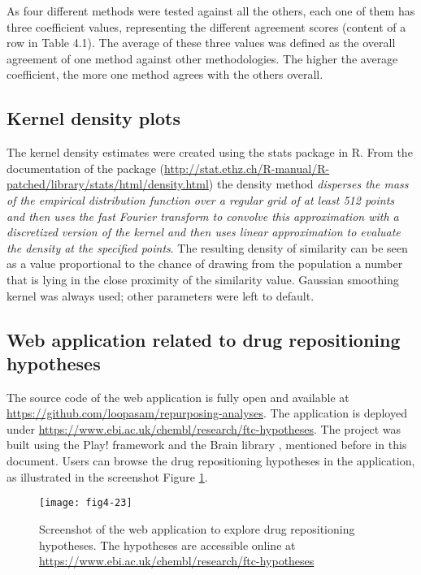 As four different methods were tested against all the others, each one of them has three coefficient values, representing the different agreement scores (content of a row in Table 4.1). The average of these three values was defined as the overall agreement of one method against other methodologies. The higher the average coefficient, the more one method agrees with the others overall.

\subsection{Kernel density plots}
The kernel density estimates were created using the stats package in R. From the documentation of the package (\url{http://stat.ethz.ch/R-manual/R-patched/library/stats/html/density.html}) the density method \emph{disperses the mass of the empirical distribution function over a regular grid of at least 512 points and then uses the fast Fourier transform to convolve this approximation with a discretized version of the kernel and then uses linear approximation to evaluate the density at the specified points}. The resulting density of similarity can be seen as a value proportional to the chance of drawing from the population a number that is lying in the close proximity of the similarity value. Gaussian smoothing kernel was always used; other parameters were left to default.

\subsection{Web application related to drug repositioning hypotheses}
The source code of the web application is fully open and available at \url{https://github.com/loopasam/repurposing-analyses}. The application is deployed under \url{https://www.ebi.ac.uk/chembl/research/ftc-hypotheses}. The project was built using the Play! framework and the Brain library \citep{croset2013brain}, mentioned before in this document. Users can browse the drug repositioning hypotheses in the application, as illustrated in the screenshot Figure \ref{fig4-23}.

\begin{figure}[ht]
    \centering
    \texttt{[image: fig4-23]}
    \caption{Screenshot of the web application to explore drug repositioning hypotheses. The hypotheses are accessible online at \url{https://www.ebi.ac.uk/chembl/research/ftc-hypotheses}}
    \label{fig4-23}
\end{figure}


